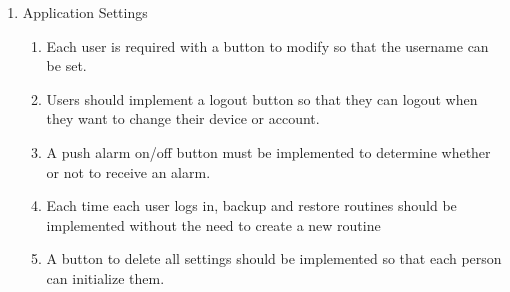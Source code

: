 \begin{enumerate}[label=\arabic*.]
      \item {\large{Application Settings}}\\
            \begin{enumerate}[label*={\arabic*.},ref=\theenumi.\arabic*]
                  \setlength{\itemindent}{0.5cm}
                  \item Each user is required with a button to modify so that the username can be set.\\

                  \item Users should implement a logout button so that they can logout when they want to change their device or account.\\

                  \item A push alarm on/off button must be implemented to determine whether or not to receive an alarm.\\

                  \item Each time each user logs in, backup and restore routines should be implemented without the need to create a new routine\\

                  \item A button to delete all settings should be implemented so that each person can initialize them.\\

            \end{enumerate}
\end{enumerate}